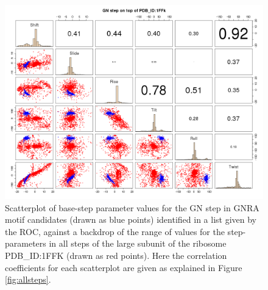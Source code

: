 \begin{figure}
\centering 
\includegraphics[angle=90, scale=0.5]{Chapter5/GNRAin1ffk.png}
\caption{Scatterplot of base-step parameter  values for the GN step in
  GNRA motif  candidates (drawn as  blue points) identified in  a list
  given by the ROC, against a  backdrop of the range of values for the
  step-parameters in  all steps of  the large subunit of  the ribosome
  PDB\_ID:1FFK   (drawn  as   red  points).    Here   the  correlation
  coefficients for  each scatterplot are given as  explained in Figure
  \ref{fig:allsteps}.}
\label{fig:scattergnra}
\end{figure}
%
%




